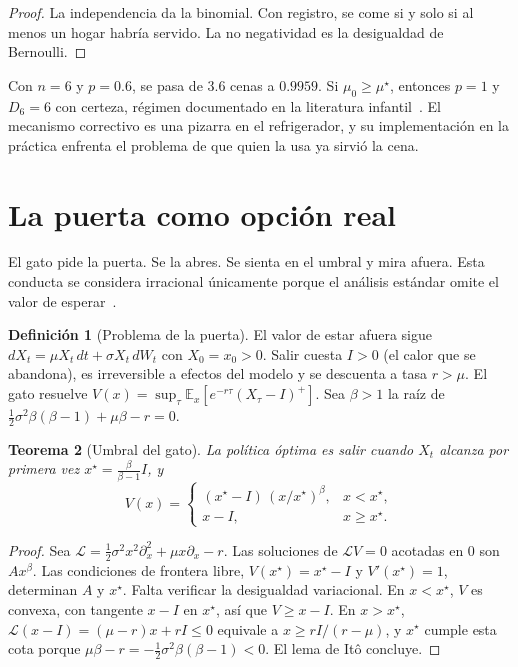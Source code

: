 \documentclass[11pt,a4paper]{article}
\theoremstyle{plain}
\newtheorem{teorema}{Teorema}[section]
\theoremstyle{definition}
\newtheorem{definicion}[teorema]{Definición}
\theoremstyle{remark}
\numberwithin{equation}{section}
\newcommand{\E}{\mathbb{E}}
\begin{document}
\begin{proof}
La independencia da la binomial. Con registro, se come si y solo si al menos un hogar habría servido. La no negatividad es la desigualdad de Bernoulli.
\end{proof}

Con $n=6$ y $p=0.6$, se pasa de $3.6$ cenas a $0.9959$. Si $\mu_0\ge\mu^\star$, entonces $p=1$ y $D_6=6$ con certeza, régimen documentado en la literatura infantil~\cite{moore}. El mecanismo correctivo es una pizarra en el refrigerador, y su implementación en la práctica enfrenta el problema de que quien la usa ya sirvió la cena.

\section{La puerta como opción real}\label{sec:puerta}

El gato pide la puerta. Se la abres. Se sienta en el umbral y mira afuera. Esta conducta se considera irracional únicamente porque el análisis estándar omite el valor de esperar~\cite{mcdonaldsiegel,dixitpindyck}.

\begin{definicion}[Problema de la puerta]
El valor de estar afuera sigue $dX_t=\mu X_t\,dt+\sigma X_t\,dW_t$ con $X_0=x_0>0$. Salir cuesta $I>0$ (el calor que se abandona), es irreversible a efectos del modelo y se descuenta a tasa $r>\mu$. El gato resuelve $V(x)=\sup_\tau\E_x[e^{-r\tau}(X_\tau-I)^+]$. Sea $\beta>1$ la raíz de $\tfrac12\sigma^2\beta(\beta-1)+\mu\beta-r=0$.
\end{definicion}

\begin{teorema}[Umbral del gato]\label{teo:umbral}
La política óptima es salir cuando $X_t$ alcanza por primera vez $x^\star=\frac{\beta}{\beta-1}I$, y
\begin{equation}
  V(x)=\begin{cases}(x^\star-I)\,(x/x^\star)^{\beta}, & x<x^\star,\\ x-I, & x\ge x^\star.\end{cases}
\end{equation}
\end{teorema}

\begin{proof}
Sea $\mathcal L=\tfrac12\sigma^2x^2\partial_x^2+\mu x\partial_x-r$. Las soluciones de $\mathcal LV=0$ acotadas en $0$ son $Ax^\beta$. Las condiciones de frontera libre, $V(x^\star)=x^\star-I$ y $V'(x^\star)=1$, determinan $A$ y $x^\star$. Falta verificar la desigualdad variacional. En $x<x^\star$, $V$ es convexa, con tangente $x-I$ en $x^\star$, así que $V\ge x-I$. En $x>x^\star$, $\mathcal L(x-I)=(\mu-r)x+rI\le 0$ equivale a $x\ge rI/(r-\mu)$, y $x^\star$ cumple esta cota porque $\mu\beta-r=-\tfrac12\sigma^2\beta(\beta-1)<0$. El lema de Itô concluye.
\end{proof}
\end{document}
